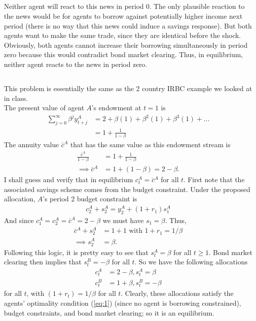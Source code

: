 \documentclass[12pt]{article}
\begin{document}
\subsection{}
Neither agent will react to this news in period 0. The only plausible reaction to the news would be for agents to borrow against potentially higher income next period (there is no way that this news could induce a savings response). But both agents want to make the same trade, since they are identical before the shock. Obviously, both agents cannot increase their borrowing simultaneously in period zero because this would contradict bond market clearing. Thus, in equilibrium, neither agent reacts to the news in period zero.

\subsection{}
This problem is essentially the same as the 2 country IRBC example we looked at in class.\\ 

The present value of agent $A$'s endowment at $t=1$ is
\begin{align*}
\sum_{j=0}^\infty \beta^jy^A_{t+j} &= 2 + \beta(1) + \beta^2(1) + \beta^3(1)+...\\
&= 1 + \frac{1}{1-\beta}
\end{align*}
The annuity value $\bar c^A$ that has the same value as this endowment stream is 
\begin{align*}
\frac{\bar c^A}{1-\beta} &= 1 + \frac{1}{1-\beta}\\
\implies \bar c^A &=1 + (1-\beta) = 2-\beta.
\end{align*}
I shall guess and verify that in equilibrium $c_t^A =\bar c^A$ for all $t$. First note that the associated savings scheme comes from the budget constraint. Under the proposed allocation, $A$'s period 2 budget constraint is
\begin{align*}
c_2^A + s^A_2 = y^A_2 + (1+r_1)s^A_1
\end{align*}
And since $c_1^A = c_2^A =\bar c^A  =2-\beta$ we must have $s_1 = \beta$. Thus, 
\begin{align*}
\bar c^A + s^A_2  &=1 + 1 \text{ with } 1+r_1 = 1/\beta\\
\implies s^A_2 &= \beta.
\end{align*}
Following this logic, it is pretty easy to see that $s_t^A = \beta$ for all $t \geq 1$. Bond market clearing then implies that $s_t^B = -\beta$ for all $t$. So we have the following allocations
\begin{align*}
c_t^A &= 2-\beta, s_t^A = \beta\\
c_t^B &= 1+\beta, s_t^B = -\beta
\end{align*}
for all $t$, with $(1+r_t) = 1/\beta$ for all $t$. Clearly, these allocations satisfy the agents' optimality condition (\ref{eq:1}) (since no agent is borrowing constrained), budget constraints, and bond market clearing; so it is an equilibrium.
\end{document}
